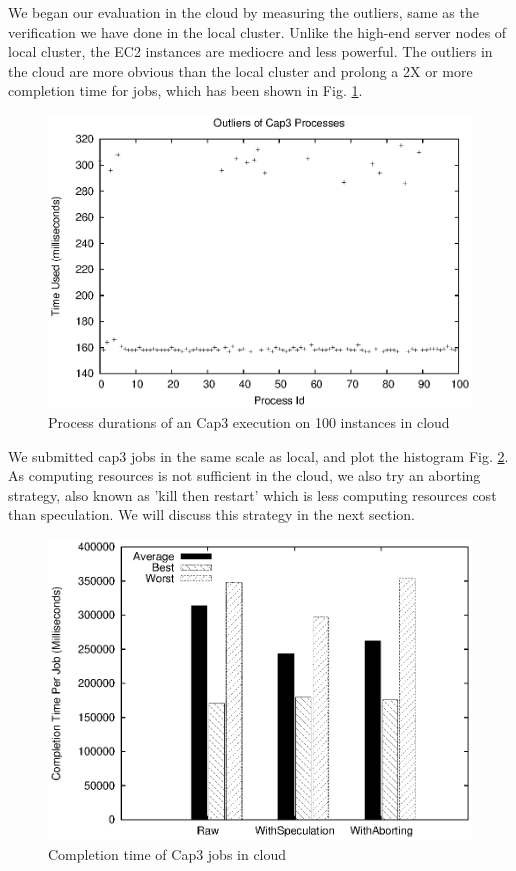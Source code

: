 We began our evaluation in the cloud by measuring the outliers, same as the verification
we have done in the local cluster. Unlike the high-end server nodes of local cluster, the
EC2 instances are mediocre and less powerful. The outliers in the cloud are more obvious
than the local cluster and prolong a 2X or more completion time for jobs, which has been
shown in Fig. \ref{figure:outlier_cloud}.

\begin{figure}
\centering
\includegraphics[width=0.9\columnwidth]{figures/cloud_outliers.eps}
\caption{Process durations of an Cap3 execution on 100 instances in cloud}
\label{figure:outlier_cloud}
\end{figure}

We submitted cap3 jobs in the same scale as local, and plot the histogram Fig.
\ref{figure:completiontime_cap3_cloud}. As computing resources is not sufficient in the
cloud, we also try an aborting strategy, also known as 'kill then restart' which is less
computing resources cost than speculation. We will discuss this strategy in the next
section.

\begin{figure}
\centering
\includegraphics[width=0.9\columnwidth]{figures/cloud_completiontime_cap3.eps}
\caption{Completion time of Cap3 jobs in cloud}
\label{figure:completiontime_cap3_cloud}
\end{figure}

